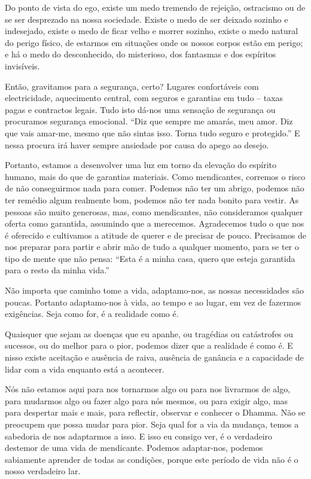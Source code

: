 Do ponto de vista do ego, existe um medo tremendo de rejeição, ostracismo ou de
se ser desprezado na nossa sociedade. Existe o medo de ser deixado sozinho e
indesejado, existe o medo de ficar velho e morrer sozinho, existe o medo natural
do perigo físico, de estarmos em situações onde os nossos corpos estão em
perigo; e há o medo do desconhecido, do misterioso, dos fantasmas e dos
espíritos invisíveis.

Então, gravitamos para a segurança, certo? Lugares confortáveis com
electricidade, aquecimento central, com seguros e garantias em tudo -- taxas
pagas e contractos legais. Tudo isto dá-nos uma sensação de segurança ou
procuramos segurança emocional. ``Diz que sempre me amarás, meu amor. Diz que
vais amar-me, mesmo que não sintas isso. Torna tudo seguro e protegido.'' E
nessa procura irá haver sempre ansiedade por causa do apego ao desejo.

Portanto, estamos a desenvolver uma luz em torno da elevação do espírito humano,
mais do que de garantias materiais. Como mendicantes, corremos o risco de não
conseguirmos nada para comer. Podemos não ter um abrigo, podemos não ter remédio
algum realmente bom, podemos não ter nada bonito para vestir. As pessoas são
muito generosas, mas, como mendicantes, não consideramos qualquer oferta como
garantida, assumindo que a merecemos. Agradecemos tudo o que nos é oferecido e
cultivamos a atitude de querer e de precisar de pouco. Precisamos de nos
preparar para partir e abrir mão de tudo a qualquer momento, para se ter o tipo
de mente que não pensa: ``Esta é a minha casa, quero que esteja garantida para o
resto da minha vida.''

Não importa que caminho tome a vida, adaptamo-nos, as nossas necessidades são
poucas. Portanto adaptamo-nos à vida, ao tempo e ao lugar, em vez de fazermos
exigências. Seja como for, é a realidade como é.

Quaisquer que sejam as doenças que eu apanhe, ou tragédias ou catástrofes ou
sucessos, ou do melhor para o pior, podemos dizer que a realidade é como é. E
nisso existe aceitação e ausência de raiva, ausência de ganância e a capacidade
de lidar com a vida enquanto está a acontecer.

Nós não estamos aqui para nos tornarmos algo ou para nos livrarmos de algo, para
mudarmos algo ou fazer algo para nós mesmos, ou para exigir algo, mas para
despertar mais e mais, para reflectir, observar e conhecer o Dhamma. Não se
preocupem que possa mudar para pior. Seja qual for a via da mudança, temos a
sabedoria de nos adaptarmos a isso. E isso eu consigo ver, é o verdadeiro
destemor de uma vida de mendicante. Podemos adaptar-nos, podemos sabiamente
aprender de todas as condições, porque este período de vida não é o nosso
verdadeiro lar.

